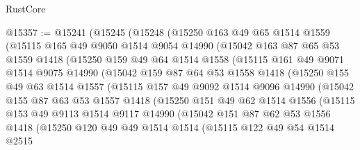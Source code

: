 \begin{lexlean}{RustCore}
\begin{coremodule}
@15357 := @15241
    (@15245
      (@15248
        (@15250
          @163
          @49
          @65
          @1514
          @1559
          (@15115
            @165
            @49
            @9050
            @1514
            @9054
            @14990
            (@15042
              @163
              @87
              @65
              @53
              @1559
              @1418
              (@15250
                @159
                @49
                @64
                @1514
                @1558
                (@15115
                  @161
                  @49
                  @9071
                  @1514
                  @9075
                  @14990
                  (@15042
                    @159
                    @87
                    @64
                    @53
                    @1558
                    @1418
                    (@15250
                      @155
                      @49
                      @63
                      @1514
                      @1557
                      (@15115
                        @157
                        @49
                        @9092
                        @1514
                        @9096
                        @14990
                        (@15042
                          @155
                          @87
                          @63
                          @53
                          @1557
                          @1418
                          (@15250
                            @151
                            @49
                            @62
                            @1514
                            @1556
                            (@15115
                              @153
                              @49
                              @9113
                              @1514
                              @9117
                              @14990
                              (@15042
                                @151
                                @87
                                @62
                                @53
                                @1556
                                @1418
                                (@15250
                                  @120
                                  @49
                                  @49
                                  @1514
                                  @1514
                                  (@15115
                                    @122
                                    @49
                                    @54
                                    @1514
                                    @2515

\end{coremodule}
\end{lexlean}
